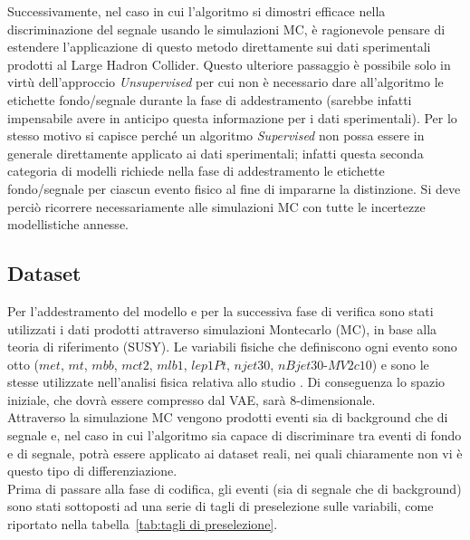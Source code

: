 Successivamente, nel caso in cui l'algoritmo si dimostri efficace nella discriminazione del segnale usando le simulazioni MC, è ragionevole pensare di estendere l'applicazione di questo metodo direttamente sui dati sperimentali prodotti al Large Hadron Collider. Questo ulteriore passaggio è possibile solo in virtù dell'approccio \textit{Unsupervised} per cui non è necessario dare all'algoritmo le etichette fondo/segnale durante la fase di addestramento (sarebbe infatti impensabile avere in anticipo questa informazione per i dati sperimentali). Per lo stesso motivo si capisce perché un algoritmo \textit{Supervised} non possa essere in generale direttamente applicato ai dati sperimentali; infatti questa seconda categoria di modelli richiede nella fase di addestramento le etichette fondo/segnale per ciascun evento fisico al fine di impararne la distinzione. Si deve perciò ricorrere necessariamente alle simulazioni MC con tutte le incertezze modellistiche annesse.
\newpage

\subsection{Dataset}
\label{dataset}
Per l'addestramento del modello e per la successiva fase di verifica sono stati utilizzati i dati prodotti attraverso simulazioni Montecarlo (MC), in base alla teoria di riferimento (SUSY). Le variabili fisiche che definiscono ogni evento sono otto ($\textit{met}$, $\textit{mt}$, $\textit{mbb}$, $\textit{mct2}$, $\textit{mlb1}$, $\textit{lep1Pt}$, $\textit{njet30}$, $\textit{nBjet30-MV2c10}$) e sono le stesse utilizzate nell'analisi fisica relativa allo studio \cite{susy_alberto}. Di conseguenza lo spazio iniziale, che dovrà essere compresso dal VAE, sarà 8-dimensionale. \\
Attraverso la simulazione MC vengono prodotti eventi sia di background che di segnale e, nel caso in cui l'algoritmo sia capace di discriminare tra eventi di fondo e di segnale, potrà essere applicato ai dataset reali, nei quali chiaramente non vi è questo tipo di differenziazione.\\ 
Prima di passare alla fase di codifica, gli eventi (sia di segnale che di background) sono stati sottoposti ad una serie di tagli di preselezione sulle variabili, come riportato nella tabella~\ref{tab:tagli di preselezione}.

